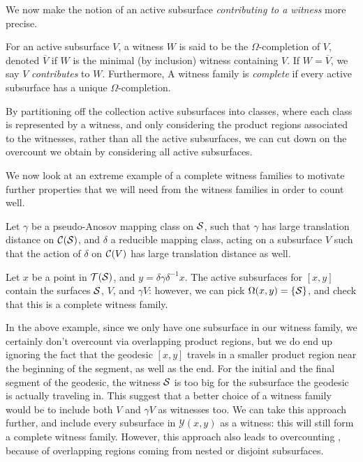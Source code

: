 \documentclass[12pt, reqno]{amsart}
\begin{document}
We now make the notion of an active subsurface \emph{contributing to a witness} more precise.
\begin{definition}
  For an active subsurface $V$, a witness $W$ is said to be the $\Omega$-completion of $V$, denoted $\overline{V}$  if $W$ is the minimal (by inclusion) witness containing $V$.
  If $W = \overline{V}$, we say $V$ \emph{contributes} to $W$.
  Furthermore, A witness family is \emph{complete} if every active subsurface has a unique $\Omega$-completion.
\end{definition}

By partitioning off the collection active subsurfaces into classes, where each class is represented by a witness, and only considering the product regions associated to the witnesses, rather than all the active subsurfaces, we can cut down on the overcount we obtain by considering all active subsurfaces.

We now look at an extreme example of a complete witness families to motivate further properties that we will need from the witness families in order to count well.

\begin{example}
  \label{ex:uninsulated}
  Let $\gamma$ be a pseudo-Anosov mapping class on $\mathcal{S}$, such that $\gamma$ has large translation distance on $\mathcal{C}(\mathcal{S})$, and $\delta$ a reducible mapping class, acting on a subsurface $V$ such that the action of $\delta$ on $\mathcal{C}(V)$ has large translation distance as well.

  Let $x$ be a point in $\mathcal{T}(\mathcal{S})$, and $y = \delta \gamma \delta^{-1} x$.
  The active subsurfaces for $[x, y]$ contain the surfaces $\mathcal{S}$, $V$, and $\gamma V$: however, we can pick $\Omega(x,y) = \left\{ \mathcal{S} \right\}$, and check that this is a complete witness family.
\end{example}

  In the above example, since we only have one subsurface in our witness family, we certainly don't overcount via overlapping product regions, but we do end up ignoring the fact that the geodesic $[x,y]$ travels in a smaller product region near the beginning of the segment, as well as the end.
  For the initial and the final segment of the geodesic, the witness $\mathcal{S}$ is too big for the subsurface the geodesic is actually traveling in.
  This suggest that a better choice of a witness family would be to include both $V$ and $\gamma V$ as witnesses too.
  We can take this approach further, and include every subsurface in $\mathcal{Y}(x,y)$ as a witness: this will still form a complete witness family.
  However, this approach also leads to overcounting , because of overlapping regions coming from nested or disjoint subsurfaces.
\end{document}
